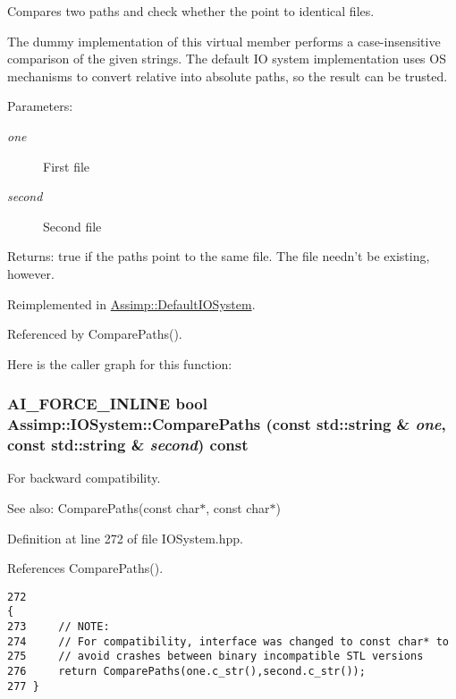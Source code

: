 Compares two paths and check whether the point to identical files. 

The dummy implementation of this virtual member performs a case-insensitive comparison of the given strings. The default IO system implementation uses OS mechanisms to convert relative into absolute paths, so the result can be trusted. \begin{Desc}
\item[Parameters:]
\begin{description}
\item[{\em one}]First file \item[{\em second}]Second file \end{description}
\end{Desc}
\begin{Desc}
\item[Returns:]true if the paths point to the same file. The file needn't be existing, however. \end{Desc}


Reimplemented in \hyperlink{class_assimp_1_1_default_i_o_system_0eb1be0b288bdad621f9036bd5290fe7}{Assimp::DefaultIOSystem}.

Referenced by ComparePaths().

Here is the caller graph for this function:\hypertarget{class_assimp_1_1_i_o_system_39a29f6ee6b76deaa59aed2b7494b182}{
\subsubsection[ComparePaths]{\setlength{\rightskip}{0pt plus 5cm}AI\_\-FORCE\_\-INLINE bool Assimp::IOSystem::ComparePaths (const std::string \& {\em one}, \/  const std::string \& {\em second}) const}}
\label{class_assimp_1_1_i_o_system_39a29f6ee6b76deaa59aed2b7494b182}


For backward compatibility. 

\begin{Desc}
\item[See also:]ComparePaths(const char$\ast$, const char$\ast$) \end{Desc}


Definition at line 272 of file IOSystem.hpp.

References ComparePaths().

\begin{Code}\begin{verbatim}272                                                                                 {
273     // NOTE:
274     // For compatibility, interface was changed to const char* to
275     // avoid crashes between binary incompatible STL versions
276     return ComparePaths(one.c_str(),second.c_str());
277 }
\end{verbatim}
\end{Code}




